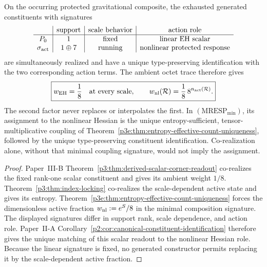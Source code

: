 \documentclass[12pt,a4paper]{article}
\begin{document}
\begin{theorem}
\label{p3:rem:index-locking-status}
On the occurring protected gravitational composite, the exhausted generated
constituents with signatures
\[
\begin{array}{c|c|c|c}
&\text{support}&\text{scale behavior}&\text{action role}\\ \hline
P_0&1&\text{fixed}&\text{linear EH scalar}\\
\sigma_{\rm act}&1\oplus7&\text{running}&\text{nonlinear protected response}
\end{array}
\]
are simultaneously realized and have a unique type-preserving
identification with the two corresponding action terms.  The ambient octet
trace therefore gives
\[
 \boxed{w_{\rm EH}=\frac18\quad\text{at every scale},\qquad
 w_{\rm nl}(\mathcal R)=\frac18\,8^{n_{\rm act}(\mathcal R)}.}
\]
The second factor never replaces or interpolates the first.
In \((\mathrm{MRESP}_{\min})\), its assignment to the nonlinear Hessian is
the unique entropy-sufficient, tensor-multiplicative coupling of
Theorem~\ref{p3e:thm:entropy-effective-count-uniqueness}, followed by the
unique type-preserving constituent identification.  Co-realization alone,
without that minimal coupling signature, would not imply the assignment.
\end{theorem}

\begin{proof}
Paper~III-B Theorem~\ref{p3:thm:derived-scalar-corner-readout} co-realizes
the fixed rank-one scalar constituent and gives its ambient weight \(1/8\).
Theorem~\ref{p3:thm:index-locking} co-realizes the scale-dependent active
state and gives its entropy.  Theorem~\ref{p3e:thm:entropy-effective-count-uniqueness}
forces the dimensionless active fraction
\(w_{\rm nl}:=e^{S}/8\) in the minimal composition signature.  The displayed signatures differ in
support rank, scale dependence, and action role.  Paper~II-A
Corollary~\ref{p2:cor:canonical-constituent-identification} therefore gives
the unique matching of this scalar readout to the nonlinear Hessian role.
Because the linear signature is fixed, no generated
constructor permits replacing it by the scale-dependent active fraction.
\end{proof}
\end{document}
